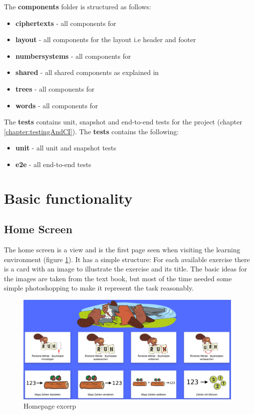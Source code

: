 The \textbf{components} folder is structured as follows:

\begin{itemize}
    \item \textbf{ciphertexts} - all components for 
    \item \textbf{layout} - all components for the layout i.e header and footer
    \item \textbf{numbersystems} - all components for 
    \item \textbf{shared} - all shared components as explained in 
    \item \textbf{trees} - all components for 
    \item \textbf{words} - all components for 
\end{itemize}

The \textbf{tests} contains unit, snapshot and end-to-end tests for the project (chapter \ref{chapter:testingAndCI}). The \textbf{tests} contains the following:

\begin{itemize}
    \item \textbf{unit} - all unit and snapshot tests
    \item \textbf{e2e} - all end-to-end tests
\end{itemize}

\section{Basic functionality}
\label{section:basicFunctionality}

\subsection{Home Screen}
The home screen is a view and is the first page seen when visiting the learning environment (figure \ref{fig:homepage}). It has a simple structure: For each available exercise there is a card with an image to illustrate the exercise and its title. The basic ideas for the images are taken from the text book, but most of the time needed some simple photoshopping to make it represent the task reasonably.

\begin{figure} 
    \centering
    \includegraphics[width=1.0 \columnwidth]{figures/homepage.png}
    \caption{Homepage excerp} 
    \label{fig:homepage} 
\end{figure}


